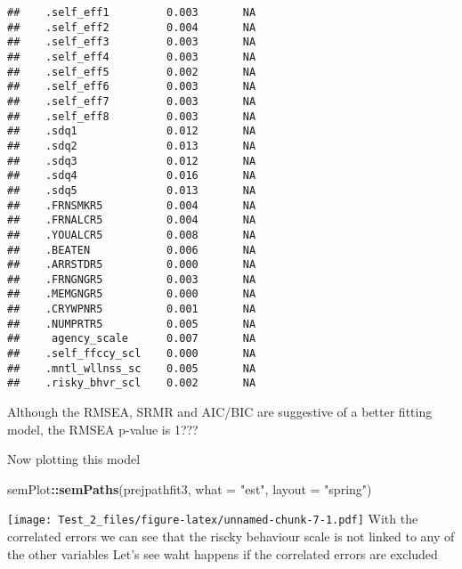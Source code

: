 \documentclass[9pt,]{article}
\newenvironment{Shaded}{\begin{snugshade}}{\end{snugshade}}
\newcommand{\KeywordTok}[1]{\textcolor[rgb]{0.13,0.29,0.53}{\textbf{#1}}}
\newcommand{\DataTypeTok}[1]{\textcolor[rgb]{0.13,0.29,0.53}{#1}}
\newcommand{\StringTok}[1]{\textcolor[rgb]{0.31,0.60,0.02}{#1}}
\newcommand{\OperatorTok}[1]{\textcolor[rgb]{0.81,0.36,0.00}{\textbf{#1}}}
\newcommand{\NormalTok}[1]{#1}
\begin{document}
\begin{verbatim}
##    .self_eff1         0.003       NA                  
##    .self_eff2         0.004       NA                  
##    .self_eff3         0.003       NA                  
##    .self_eff4         0.003       NA                  
##    .self_eff5         0.002       NA                  
##    .self_eff6         0.003       NA                  
##    .self_eff7         0.003       NA                  
##    .self_eff8         0.003       NA                  
##    .sdq1              0.012       NA                  
##    .sdq2              0.013       NA                  
##    .sdq3              0.012       NA                  
##    .sdq4              0.016       NA                  
##    .sdq5              0.013       NA                  
##    .FRNSMKR5          0.004       NA                  
##    .FRNALCR5          0.004       NA                  
##    .YOUALCR5          0.008       NA                  
##    .BEATEN            0.006       NA                  
##    .ARRSTDR5          0.000       NA                  
##    .FRNGNGR5          0.003       NA                  
##    .MEMGNGR5          0.000       NA                  
##    .CRYWPNR5          0.001       NA                  
##    .NUMPRTR5          0.005       NA                  
##     agency_scale      0.007       NA                  
##    .self_ffccy_scl    0.000       NA                  
##    .mntl_wllnss_sc    0.005       NA                  
##    .risky_bhvr_scl    0.002       NA
\end{verbatim}

Although the RMSEA, SRMR and AIC/BIC are suggestive of a better fitting
model, the RMSEA p-value is 1???

Now plotting this model

\begin{Shaded}
\begin{Highlighting}[]
\NormalTok{semPlot}\OperatorTok{::}\KeywordTok{semPaths}\NormalTok{(prejpathfit3, }\DataTypeTok{what =} \StringTok{"est"}\NormalTok{, }\DataTypeTok{layout =} \StringTok{"spring"}\NormalTok{)}
\end{Highlighting}
\end{Shaded}

\texttt{[image: Test\_2\_files/figure-latex/unnamed-chunk-7-1.pdf]} With
the correlated errors we can see that the riscky behaviour scale is not
linked to any of the other variables Let's see waht happens if the
correlated errors are excluded
\end{document}
